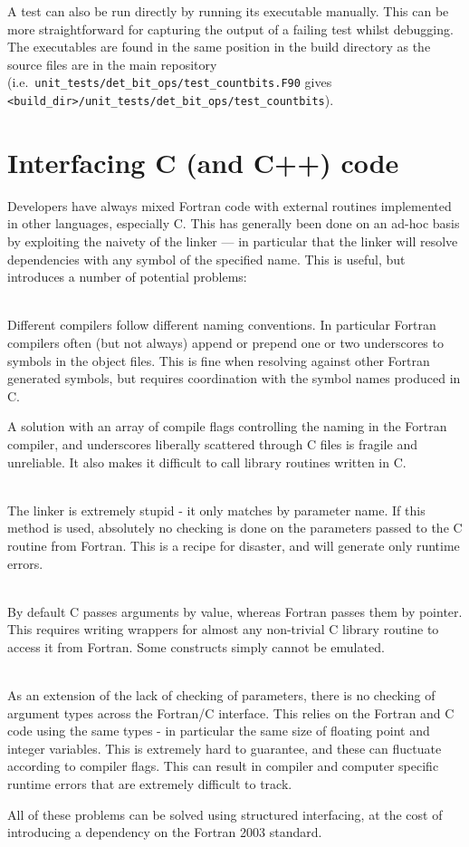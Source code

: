 \documentclass[a4paper,notitlepage,dvipsnames]{scrreprt}
\newcommand\headitem[1]{\needspace{1.5\baselineskip}\item[{\boldmath #1 \nopagebreak}] \hfill \\ \nopagebreak}
\let\code\lstinline
\begin{document}
{{{    A test can also be run directly by running its executable manually. This can be more
    straightforward for capturing the output of a failing test whilst debugging. The
    executables are found in the same position in the build directory as the source files
    are in the main repository (i.e.\ \code[breaklines=true]{unit_tests/det_bit_ops/test_countbits.F90}
    gives \code[breaklines=true]{<build_dir>/unit_tests/det_bit_ops/test_countbits}).

\section{Interfacing C (and C++) code}
Developers have always mixed Fortran code with external routines implemented
in other languages, especially C. This has generally been done on an ad-hoc
basis by exploiting the naivety of the linker --- in particular that the linker
will resolve dependencies with any symbol of the specified name. This is
useful, but introduces a number of potential problems:
\begin{description}
	\headitem{Name clashes}
		Different compilers follow different naming conventions. In particular
		Fortran compilers often (but not always) append or prepend one or two
		underscores to symbols in the object files. This is fine when resolving
		against other Fortran generated symbols, but requires coordination with
		the symbol names produced in C.

		A solution with an array of compile flags controlling the naming in the
		Fortran compiler, and underscores liberally scattered through C files
		is fragile and unreliable. It also makes it difficult to call library
		routines written in C.

	\headitem{No checking of parameters}
		The linker is extremely stupid - it only matches by parameter name. If
		this method is used, absolutely no checking is done on the parameters
		passed to the C routine from Fortran. This is a recipe for disaster,
		and will generate only runtime errors.

	\headitem{Calling}
		By default C passes arguments by value, whereas Fortran passes them
		by pointer. This requires writing wrappers for almost any non-trivial
		C library routine to access it from Fortran. Some constructs simply
		cannot be emulated.

	\headitem{Variable types}
		As an extension of the lack of checking of parameters, there is no
		checking of argument types across the Fortran/C interface. This relies
		on the Fortran and C code using the same types - in particular the
		same size of floating point and integer variables. This is extremely
		hard to guarantee, and these can fluctuate according to compiler flags.
		This can result in compiler and computer specific runtime errors that
		are extremely difficult to track.
\end{description}
All of these problems can be solved using structured interfacing, at the cost
of introducing a dependency on the Fortran 2003 standard.

}}}
\end{document}
